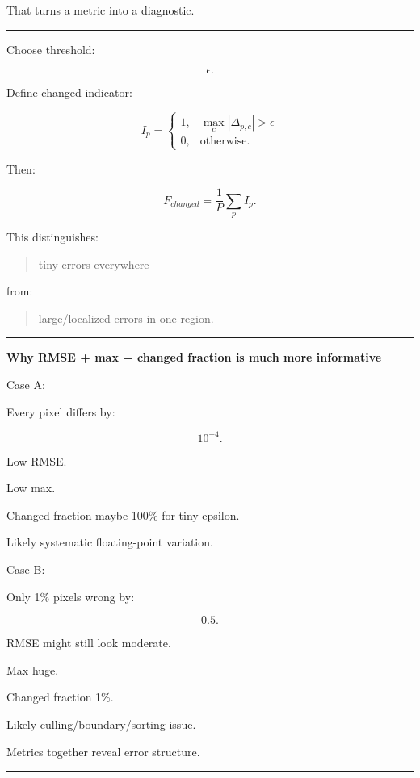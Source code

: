 That turns a metric into a diagnostic.

\begin{center}\rule{0.5\linewidth}{0.5pt}\end{center}

Choose threshold:

\[
\epsilon.
\]

Define changed indicator:

\[
I_p=
\begin{cases}
1,&
\max_c|\Delta_{p,c}|>\epsilon\\
0,&
\text{otherwise}.
\end{cases}
\]

Then:

\[
\boxed{
F_{changed}
=
\frac1P
\sum_p I_p.
}
\]

This distinguishes:

\begin{quote}
tiny errors everywhere
\end{quote}

from:

\begin{quote}
large/localized errors in one region.
\end{quote}

\begin{center}\rule{0.5\linewidth}{0.5pt}\end{center}

\textbf{Why RMSE + max + changed fraction is much more informative}

Case A:

Every pixel differs by:

\[
10^{-4}.
\]

Low RMSE.

Low max.

Changed fraction maybe 100\% for tiny epsilon.

Likely systematic floating-point variation.

Case B:

Only 1\% pixels wrong by:

\[
0.5.
\]

RMSE might still look moderate.

Max huge.

Changed fraction 1\%.

Likely culling/boundary/sorting issue.

Metrics together reveal error structure.

\begin{center}\rule{0.5\linewidth}{0.5pt}\end{center}

